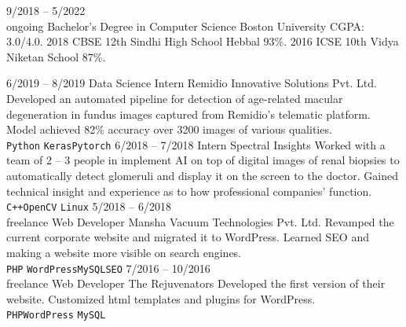 \documentclass[9pt]{developercv} %
\begin{document}
\vspace{0.5cm}



\begin{entrylist}
	\entry
		{9/2018 -- 5/2022\\\footnotesize{ongoing}}
		{Bachelor's Degree in Computer Science}
		{Boston University}
		{CGPA: 3.0/4.0.}
	\entry
		{2018}
		{CBSE 12th}
		{Sindhi High School Hebbal}
		{93\%.}
	\entry
		{2016}
		{ICSE 10th}
		{Vidya Niketan School}
		{87\%.}
\end{entrylist}



\begin{entrylist}
	\entry
		{6/2019 -- 8/2019}
		{Data Science Intern}
		{Remidio Innovative Solutions Pvt. Ltd.}
		{Developed an automated pipeline for detection of age-related macular 
		degeneration in fundus images captured from Remidio’s telematic platform. Model 
		achieved 82\% accuracy over 3200 images of various qualities.\\ \texttt{Python}
		\slashsep\texttt{Keras}\slashsep\texttt{Pytorch}}
	\entry
		{6/2018 -- 7/2018}
		{Intern}
		{Spectral Insights}
		{Worked with a team of 2 – 3 people in implement AI on top of digital images of 
		renal biopsies to automatically detect glomeruli and display it on the screen to
		the doctor. Gained technical insight and experience as to how professional 
		companies’ function. \\ \texttt{C++}\slashsep\texttt{OpenCV}
		\slashsep\texttt{Linux}}
	\entry
		{5/2018 -- 6/2018\\\footnotesize{freelance}}
		{Web Developer}
		{Mansha Vacuum Technologies Pvt. Ltd.}
		{Revamped the current corporate website and migrated it to WordPress. Learned 
		SEO and making a website more visible on search engines. \\ \texttt{PHP}
		\slashsep\texttt{WordPress}\slashsep\texttt{MySQL}\slashsep\texttt{SEO}}
	\entry
		{7/2016 -- 10/2016\\\footnotesize{freelance}}
		{Web Developer}
		{The Rejuvenators}
		{Developed the first version of their website. Customized html templates and 
		plugins for WordPress. \\ \texttt{PHP}\slashsep\texttt{WordPress}\slashsep
		\texttt{MySQL}}
\end{entrylist}
\end{document}
